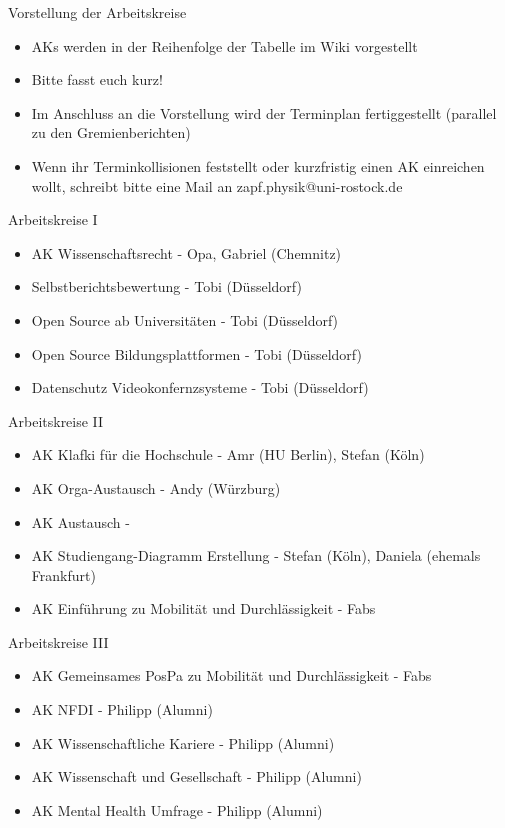 \begin{frame}{Vorstellung der Arbeitskreise}
	\begin{itemize}
		\item AKs werden in der Reihenfolge der Tabelle im Wiki vorgestellt
		\item Bitte fasst euch kurz!
		\item Im Anschluss an die Vorstellung wird der Terminplan fertiggestellt (parallel zu den Gremienberichten)
		\item Wenn ihr Terminkollisionen feststellt oder kurzfristig einen AK einreichen wollt, schreibt bitte eine Mail an zapf.physik@uni-rostock.de
	\end{itemize}
\end{frame}

\begin{frame}{Arbeitskreise I}
	\begin{itemize}
		\item AK Wissenschaftsrecht - Opa, Gabriel (Chemnitz)
		\item Selbstberichtsbewertung - Tobi (Düsseldorf)
		\item Open Source ab Universitäten - Tobi (Düsseldorf)
		\item Open Source Bildungsplattformen - Tobi (Düsseldorf)
		\item Datenschutz Videokonfernzsysteme - Tobi (Düsseldorf)
	\end{itemize}
\end{frame}

\begin{frame}{Arbeitskreise II}
	\begin{itemize}
		\item AK Klafki für die Hochschule - Amr (HU Berlin), Stefan (Köln)
		\item AK Orga-Austausch - Andy (Würzburg)
		\item AK Austausch - 
		\item AK Studiengang-Diagramm Erstellung - Stefan (Köln), Daniela (ehemals Frankfurt)
		\item AK Einführung zu Mobilität und Durchlässigkeit - Fabs
	\end{itemize}
\end{frame}

\begin{frame}{Arbeitskreise III}
	\begin{itemize}
		\item AK Gemeinsames PosPa zu Mobilität und Durchlässigkeit -  Fabs
		\item AK NFDI - Philipp (Alumni)
		\item AK Wissenschaftliche Kariere - Philipp (Alumni)
		\item AK Wissenschaft und Gesellschaft - Philipp (Alumni)
		\item AK Mental Health Umfrage - Philipp (Alumni)
	\end{itemize}
\end{frame}

